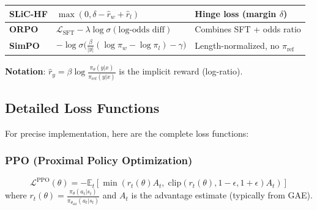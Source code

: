 \begin{center}
\begin{tabular}{|l|l|l|}
        \hline
        \textbf{SLiC-HF}                                                              &
        $\max(0, \delta - \hat{r}_w + \hat{r}_l)$                                     &
        Hinge loss (margin $\delta$)                                                                                                          \\
        \hline
        \textbf{ORPO}                                                                 &
        $\mathcal{L}_{\text{SFT}} - \lambda \log \sigma(\text{log-odds diff})$        &
        Combines SFT + odds ratio                                                                                                             \\
        \hline
        \textbf{SimPO}                                                                &
        $-\log \sigma\bigl(\frac{\beta}{|y|}(\log \pi_w - \log \pi_l) - \gamma\bigr)$ &
        Length-normalized, no $\pi_{\text{ref}}$                                                                                              \\
        \hline
    \end{tabular}
\end{center}

\noindent\textbf{Notation}: $\hat{r}_y = \beta \log \frac{\pi_\theta(y|x)}{\pi_{\text{ref}}(y|x)}$ is the implicit reward (log-ratio).

\subsection{Detailed Loss Functions}

For precise implementation, here are the complete loss functions:

\subsubsection{PPO (Proximal Policy Optimization)}
\[
    \mathcal{L}^{\text{PPO}}(\theta) = -\mathbb{E}_t \left[ \min\left( r_t(\theta) A_t, \; \text{clip}(r_t(\theta), 1-\epsilon, 1+\epsilon) A_t \right) \right]
\]
where $r_t(\theta) = \frac{\pi_\theta(a_t|s_t)}{\pi_{\theta_{\text{old}}}(a_t|s_t)}$ and $A_t$ is the advantage estimate (typically from GAE).

